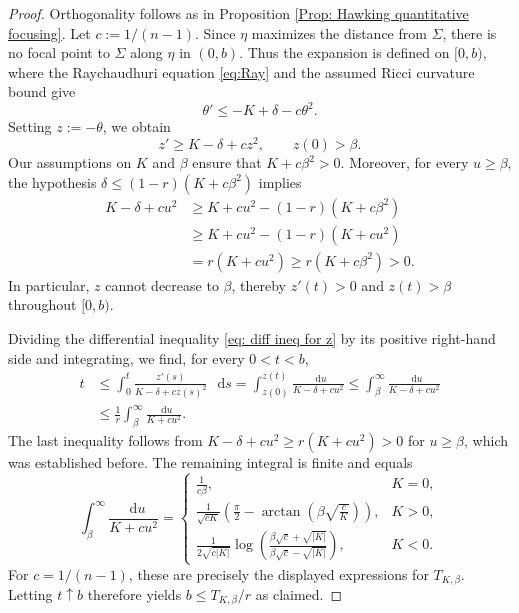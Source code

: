 \documentclass[a4paper,11pt]{article}
\numberwithin{equation}{section}
\theoremstyle{definition}
\theoremstyle{plain}
\newcommand*\diff{\mathop{}\!\mathrm{d}}
\begin{document}
\begin{proof}
Orthogonality follows as in Proposition \ref{Prop: Hawking quantitative focusing}. 
Let $c:=1/(n-1)$.
Since $\eta$ maximizes the distance from $\Sigma$, there is no focal point to $\Sigma$ along $\eta$ in $(0,b)$. 
Thus the expansion is defined on $[0,b)$, where the Raychaudhuri equation \eqref{eq:Ray} and the assumed Ricci curvature bound give
\begin{equation*}
\theta'\leq -K+\delta-c\theta^2.
\end{equation*}
Setting \(z:=-\theta\), we obtain
\begin{equation}
\label{eq: diff ineq for z}
z'\geq K-\delta+cz^2,
\qquad z(0)>\beta.
\end{equation}
Our assumptions on $K$ and $\beta$ ensure that \(K+c\beta^2>0\). 
Moreover, for every $u\geq\beta$, the hypothesis $\delta\leq(1-r)(K+c\beta^2)$ implies
\begin{align*}
K-\delta+cu^2
&\geq K+cu^2-(1-r)(K+c\beta^2)\\
&\geq K+cu^2-(1-r)(K+cu^2)\\
&= r(K+cu^2)
\geq r(K+c\beta^2)>0.
\end{align*}
In particular, $z$ cannot decrease to \(\beta\), thereby $z'(t)>0$ and $z(t)>\beta$ throughout $[0,b)$.

Dividing the differential inequality \eqref{eq: diff ineq for z} by its positive right-hand side and integrating, we find, for every $0<t<b$,
\begin{align*}
t
&\leq \int_0^t
   \frac{z'(s)}{K-\delta+cz(s)^2}\,\diff s 
=\int_{z(0)}^{z(t)}
   \frac{\diff u}{K-\delta+cu^2}
\leq\int_\beta^\infty
   \frac{\diff u}{K-\delta+cu^2}\\
&\leq\frac{1}{r}\int_\beta^\infty
   \frac{\diff u}{K+cu^2}.
\end{align*}
The last inequality follows from
\(K-\delta+cu^2\geq r(K+cu^2)>0\) for \(u\geq\beta\), which was established before. The remaining integral is finite and equals
\begin{equation*}
\int_\beta^\infty\frac{\diff u}{K+cu^2}
=
\begin{cases}
\displaystyle
\frac{1}{c\beta},
& K=0,\\[1.2ex]
\displaystyle
\frac{1}{\sqrt{cK}}
\left(\frac{\pi}{2}
-\arctan\!\left(\beta\sqrt{\frac{c}{K}}\right)\right),
& K>0,\\[1.2ex]
\displaystyle
\frac{1}{2\sqrt{c|K|}}
\log\!\left(
\frac{\beta\sqrt{c}+\sqrt{|K|}}
     {\beta\sqrt{c}-\sqrt{|K|}}
\right),
& K<0.
\end{cases}
\end{equation*}
For \(c=1/(n-1)\), these are precisely the displayed expressions for \(T_{K,\beta}\). 
Letting \(t\uparrow b\) therefore yields $b \leq T_{K,\beta}/r$ as claimed.
\end{proof}
\end{document}
